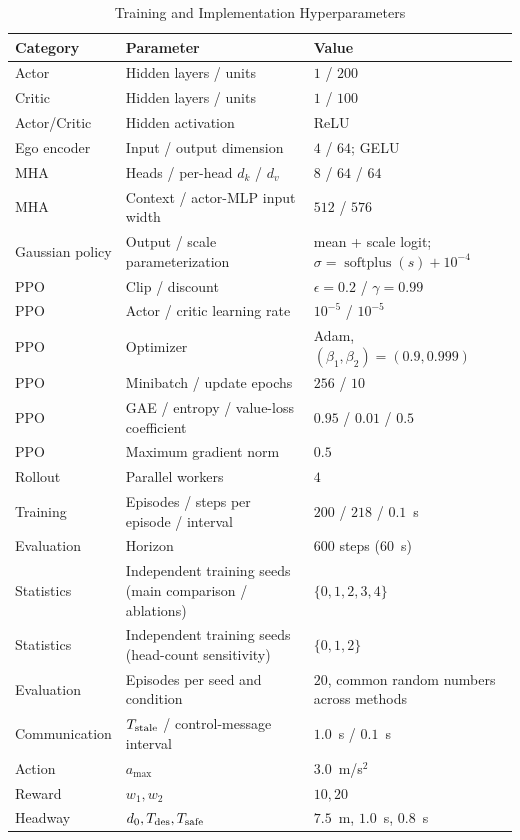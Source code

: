 \documentclass{ieeeaccess}
\begin{document}
\begin{table}[htbp]
\centering
\caption{Training and Implementation Hyperparameters}
\label{tab:training_hyperparameters}
\renewcommand{\arraystretch}{1.12}
\begin{tabular}{|l|l|l|}
\hline
\textbf{Category} & \textbf{Parameter} & \textbf{Value} \\ \hline
Actor & Hidden layers / units & $1$ / $200$ \\ \hline %
Critic & Hidden layers / units & $1$ / $100$ \\ \hline %
Actor/Critic & Hidden activation & ReLU \\ \hline %
Ego encoder & Input / output dimension & $4$ / $64$; GELU \\ \hline %
MHA & Heads / per-head $d_k$ / $d_v$ & $8$ / $64$ / $64$ \\ \hline %
MHA & Context / actor-MLP input width & $512$ / $576$ \\ \hline %
Gaussian policy & Output / scale parameterization & mean + scale logit; $\sigma=\operatorname{softplus}(s)+10^{-4}$ \\ \hline %
PPO & Clip / discount & $\epsilon=0.2$ / $\gamma=0.99$ \\ \hline %
PPO & Actor / critic learning rate & $10^{-5}$ / $10^{-5}$ \\ \hline %
PPO & Optimizer & Adam, $(\beta_1,\beta_2)=(0.9,0.999)$ \\ \hline %
PPO & Minibatch / update epochs & $256$ / $10$ \\ \hline %
PPO & GAE / entropy / value-loss coefficient & $0.95$ / $0.01$ / $0.5$ \\ \hline %
PPO & Maximum gradient norm & $0.5$ \\ \hline %
Rollout & Parallel workers & $4$ \\ \hline %
Training & Episodes / steps per episode / interval & $200$ / $218$ / $0.1$~s \\ \hline %
Evaluation & Horizon & $600$ steps ($60$~s) \\ \hline %
Statistics & Independent training seeds (main comparison / ablations) & $\{0,1,2,3,4\}$ \\ \hline %
Statistics & Independent training seeds (head-count sensitivity) & $\{0,1,2\}$ \\ \hline %
Evaluation & Episodes per seed and condition & $20$, common random numbers across methods \\ \hline %
Communication & $T_{\rm stale}$ / control-message interval & $1.0$~s / $0.1$~s \\ \hline %
Action & $a_{\max}$ & $3.0$~m/s$^2$ \\ \hline %
Reward & $w_1,w_2$ & $10,20$ \\ \hline %
Headway & $d_0,T_{\rm des},T_{\rm safe}$ & $7.5$~m, $1.0$~s, $0.8$~s \\ \hline %
\end{tabular}
\end{table}
\end{document}
